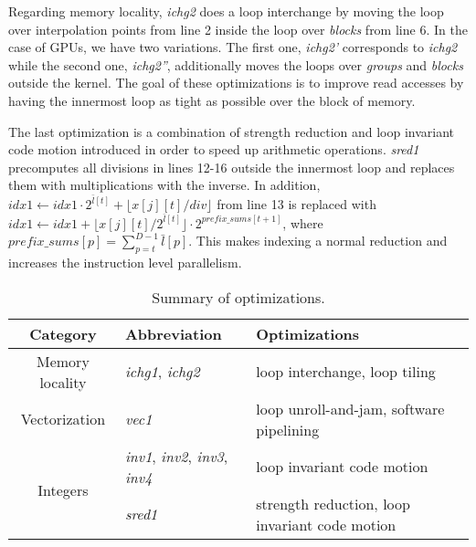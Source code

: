 Regarding memory locality, \textit{ichg2} does a loop interchange by moving the
loop over interpolation points from line 2 inside the loop over \textit{blocks}
from line 6. In the case of GPUs, we have two variations. The first one,
\textit{ichg2'} corresponds to \textit{ichg2} while the second one,
\textit{ichg2''}, additionally moves the loops over \textit{groups} and
\textit{blocks} outside the kernel. The goal of these optimizations is to
improve read accesses by having the innermost loop as tight as possible over the
block of memory.

The last optimization is a combination of strength reduction and loop invariant
code motion introduced in order to speed up arithmetic operations.
\textit{sred1} precomputes all divisions in lines 12-16 outside the innermost
loop and replaces them with multiplications with the inverse. In addition, $idx1
\leftarrow idx1 \cdot 2^{\bar{l}[t]} + \lfloor x[j][t] / div \rfloor$ from line
13 is replaced with $idx1 \leftarrow idx1 + \lfloor x[j][t] / 2^{\bar{l}[t]}
\rfloor \cdot 2^{\textit{prefix\_sums}[t + 1]}$, where $\textit{prefix\_sums}[p]
= \sum_{p=t}^{D-1}\bar{l}[p]$. This makes indexing a normal reduction and
increases the instruction level parallelism.

\begin{center}
\begin{table*}[t]
{\small
\hfill{}
\begin{tabular}{|c|l|l|}
  \hline
  \textbf{Category} & \textbf{Abbreviation} & \textbf{Optimizations} \\ 
  \hline
  Memory locality & \textit{ichg1}, \textit{ichg2} & loop interchange, loop tiling \\ 
  \hline
  Vectorization  & \textit{vec1} & loop unroll-and-jam, software pipelining \\ 
  \hline
  \multirow{2}{*}{Integers} & \textit{inv1}, \textit{inv2}, \textit{inv3}, \textit{inv4} & loop invariant code motion \\
  \cline{2-3}
  & \textit{sred1} & strength reduction, loop invariant code motion \\
  \hline
\end{tabular}}
\hfill{}
\caption{Summary of optimizations.}
\label{table:optimizations}
\end{table*}
\end{center}